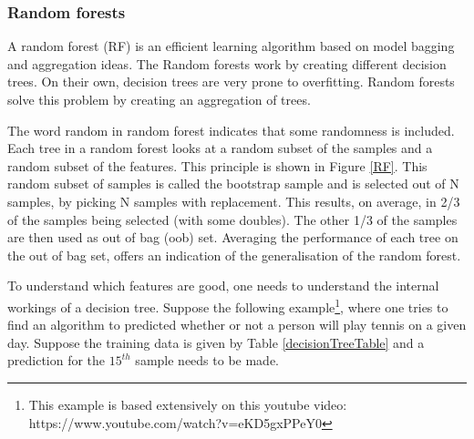 \subsubsection{Random forests}
\label{rfexpl}
A random forest (RF)  is an efficient learning algorithm based on model bagging and aggregation ideas\citep{rfPaper}. The Random forests work by creating different decision trees. On their own, decision trees are very prone to overfitting. Random forests solve this problem by creating an aggregation of trees. 

\npar

The word random in random forest indicates that some randomness is included. Each tree in a random forest looks at a random subset of the samples and a random subset of the features. This principle is shown in Figure \ref{RF}. This random subset of samples is called the bootstrap sample and is selected out of N samples, by picking N samples with replacement. This results, on average, in 2/3 of the samples being selected (with some doubles). The other 1/3 of the samples are then used as out of bag (oob)  set. Averaging the performance of each tree on the out of bag set, offers an indication of the generalisation of the random forest.


To understand which features are good, one needs to understand the internal workings of a decision tree. Suppose the following example\footnote{This example is based extensively on this youtube video: https://www.youtube.com/watch?v=eKD5gxPPeY0}, where one tries to find an algorithm to predicted whether or not a person will play tennis on a given day. Suppose the training data is given by Table \ref{decisionTreeTable} and a prediction for the $15^{th}$ sample needs to be made.

